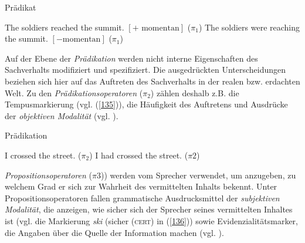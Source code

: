 \begin{exe}
	\ex\label{134} 
	Prädikat
		\begin{xlist}	
			\ex\label{134a} The soldiers reached the summit. $[\textrm{+ momentan}]$ ($\pi_{\textrm{1}}$)
			\ex\label{134b} The soldiers were reaching the summit. $[\textrm{−momentan}]$ ($\pi_{\textrm{1}}$) 
		\end{xlist}
	\hfill\hbox{\citet[134]{Hengeveld1989}}	
\end{exe}														
Auf der Ebene der \textit{Prädikation}  werden nicht interne Eigenschaften des Sachverhalts modifiziert und spezifiziert. Die ausgedrückten Unterscheidungen beziehen sich hier auf das Auftreten des Sachverhalts in der realen bzw. erdachten Welt. Zu den \textit{Prädikationsoperatoren} ($\pi_{\textrm{2}}$)  zählen deshalb z.B. die Tempusmarkierung (vgl. (\ref{135})), die Häufigkeit des Auftretens und Ausdrücke der \textit{objektiven Modalität}  (vgl. \citealt[135-138]{Hengeveld1989}).

\begin{exe}
	\ex\label{135} 
	Prädikation
		\begin{xlist}	
			\ex\label{135a} I crossed the street. ($\pi_{\textrm{2}}$)
			\ex\label{135b} I had crossed the street. ($\pi{\textrm{2}}$) 
	\hfill\hbox{\citet[136]{Hengeveld1989}}	
	\end{xlist}
\end{exe}
\textit{Propositionsoperatoren} ($\pi{\textrm{3}}$))  werden vom Sprecher verwendet, um anzugeben, zu welchem Grad er sich zur Wahrheit des vermittelten Inhalts bekennt. Unter Propositionsoperatoren fallen grammatische Ausdrucksmittel der \textit{subjektiven Mo\-dalität}, die anzeigen, wie  sicher sich der Sprecher seines vermittelten Inhaltes ist (vgl. die Markierung \textit{ski} (\glq sicher\grq {} (\textsc{cert}) in (\ref{136})) sowie Evidenzialitätsmarker, die Angaben über die Quelle der Information machen (vgl. \citealt[138-140]{Hengeveld1989}). 

